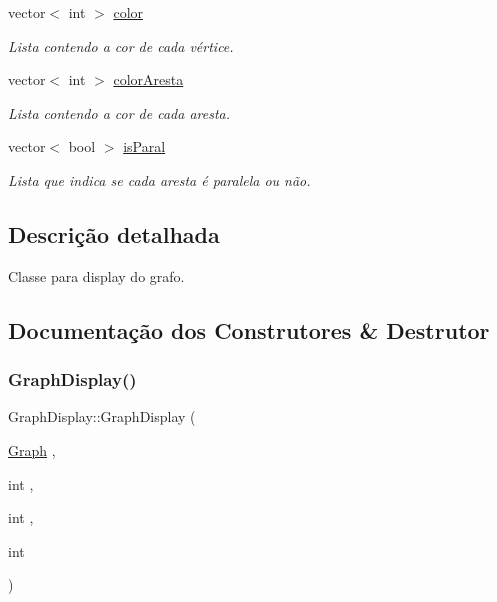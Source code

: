 \begin{DoxyCompactItemize}
vector$<$ int $>$ \hyperlink{classGraphDisplay_a4b1af3eec6797feb7cde718c3f02ce13}{color}
\begin{DoxyCompactList}\small\item\em Lista contendo a cor de cada vértice. \end{DoxyCompactList}\item 
\mbox{\label{classGraphDisplay_a22bf3aa9a0f25ea37c663667dfb79a9a}} 
vector$<$ int $>$ \hyperlink{classGraphDisplay_a22bf3aa9a0f25ea37c663667dfb79a9a}{color\+Aresta}
\begin{DoxyCompactList}\small\item\em Lista contendo a cor de cada aresta. \end{DoxyCompactList}\item 
\mbox{\label{classGraphDisplay_aca8982540186f3ba9add586f3057528c}} 
vector$<$ bool $>$ \hyperlink{classGraphDisplay_aca8982540186f3ba9add586f3057528c}{is\+Paral}
\begin{DoxyCompactList}\small\item\em Lista que indica se cada aresta é \textquotesingle{}paralela\textquotesingle{} ou não. \end{DoxyCompactList}\end{DoxyCompactItemize}


\subsection{Descrição detalhada}
Classe para display do grafo. 

\subsection{Documentação dos Construtores \& Destrutor}
\mbox{\label{classGraphDisplay_adea7ab840d8aa0646eab49709569143f}} 
\subsubsection{\texorpdfstring{Graph\+Display()}{GraphDisplay()}}
{\footnotesize\ttfamily Graph\+Display\+::\+Graph\+Display (\begin{DoxyParamCaption}\item[{\hyperlink{classGraph}{Graph}}]{,  }\item[{int}]{,  }\item[{int}]{,  }\item[{int}]{ }\end{DoxyParamCaption})}

